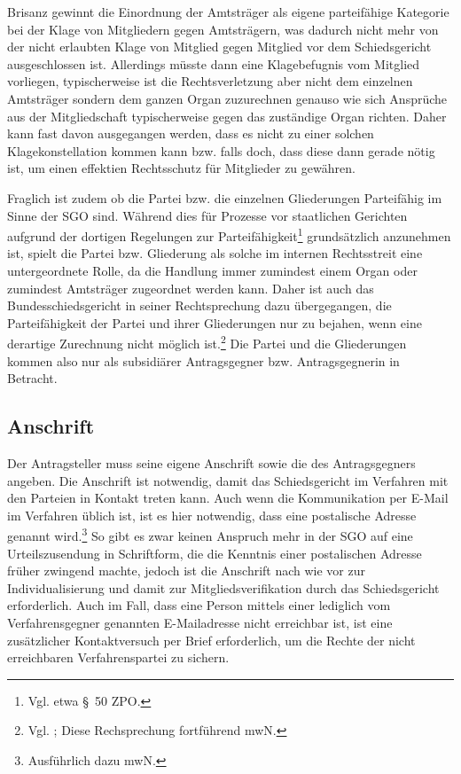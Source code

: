 Brisanz gewinnt die Einordnung der Amtsträger als eigene parteifähige Kategorie bei der Klage von Mitgliedern gegen Amtsträgern, was dadurch nicht mehr von der nicht erlaubten Klage von Mitglied gegen Mitglied vor dem Schiedsgericht ausgeschlossen ist.
Allerdings müsste dann eine Klagebefugnis vom Mitglied vorliegen, typischerweise ist die Rechtsverletzung aber nicht dem  einzelnen Amtsträger sondern dem ganzen Organ zuzurechnen genauso wie sich Ansprüche aus der Mitgliedschaft typischerweise gegen das zuständige Organ richten. 
Daher kann fast davon ausgegangen werden, dass es nicht zu einer solchen Klagekonstellation kommen kann bzw. falls doch, dass diese dann gerade nötig ist, um einen effektien Rechtsschutz für Mitglieder zu gewähren.

Fraglich ist zudem ob die Partei bzw. die einzelnen Gliederungen Parteifähig im Sinne der SGO sind.
Während dies für Prozesse vor staatlichen Gerichten aufgrund der dortigen Regelungen zur Parteifähigkeit\footnote{Vgl. etwa \S~50 ZPO.} grundsätzlich anzunehmen ist, spielt die Partei bzw. Gliederung als solche im internen Rechtsstreit eine untergeordnete Rolle, da die Handlung immer zumindest einem Organ oder zumindest Amtsträger zugeordnet werden kann.
Daher ist auch das Bundesschiedsgericht in seiner Rechtsprechung dazu übergegangen, die Parteifähigkeit der Partei und ihrer Gliederungen nur zu bejahen, wenn eine derartige Zurechnung nicht möglich ist.\footnote{Vgl. \cite[S. 4]{BSG1614HS}; Diese Rechsprechung fortführend \cite[S. 2]{BSG3815HS} mwN.}
Die Partei und die Gliederungen kommen also nur als subsidiärer Antragsgegner bzw. Antragsgegnerin in Betracht.

\subsection{Anschrift}
\label{Standardworkflow:Anschrift}
Der Antragsteller muss seine eigene Anschrift sowie die des Antragsgegners angeben.
Die Anschrift ist notwendig, damit das Schiedsgericht im Verfahren mit den Parteien in Kontakt treten kann.
Auch wenn die Kommunikation per E-Mail im Verfahren üblich ist, ist es hier notwendig, dass eine postalische Adresse genannt wird.\footnote{Ausführlich dazu \cite[S. 3]{BSG20130715} mwN.}
So gibt es zwar keinen Anspruch mehr in der SGO auf eine Urteilszusendung in Schriftform, die die Kenntnis einer postalischen Adresse früher zwingend machte, jedoch ist die Anschrift nach wie vor zur Individualisierung und damit zur Mitgliedsverifikation durch das Schiedsgericht erforderlich. Auch im Fall, dass eine Person mittels einer lediglich vom Verfahrensgegner genannten E-Mailadresse nicht erreichbar ist, ist eine zusätzlicher Kontaktversuch per Brief erforderlich, um die Rechte der nicht erreichbaren Verfahrenspartei zu sichern.

